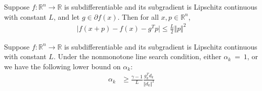 \documentclass[10pt,a4paper]{amsart}
\begin{document}
\begin{lemma}\label{L:lemma2}
Suppose $f: \mathbb{R}^n \to \mathbb{R}$ is subdifferentiable and its subgradient is Lipschitz continuous with constant $L$, and let $g \in \partial f(x)$. Then for all $x,p \in \mathbb{R}^n$,
\begin{align*}
\vert f(x+p) - f(x) - g^T p \vert \leq \frac{L}{2} \Vert p \Vert^2
\end{align*}
\end{lemma}

\begin{lemma}\label{L:lemma3} Suppose $f: \mathbb{R}^n \to \mathbb{R}$ is subdifferentiable and its subgradient is Lipschitz continuous with constant $L$. Under the nonmonotone line search condition, either $\alpha_k~=~1$, or we have the following lower bound on $\alpha_k$:
\begin{align*}
\alpha_k &\geq \frac{\gamma-1}{L} \frac{g_k^T d_k}{\Vert d_k \Vert^2}
\end{align*}
\end{lemma}
\end{document}
